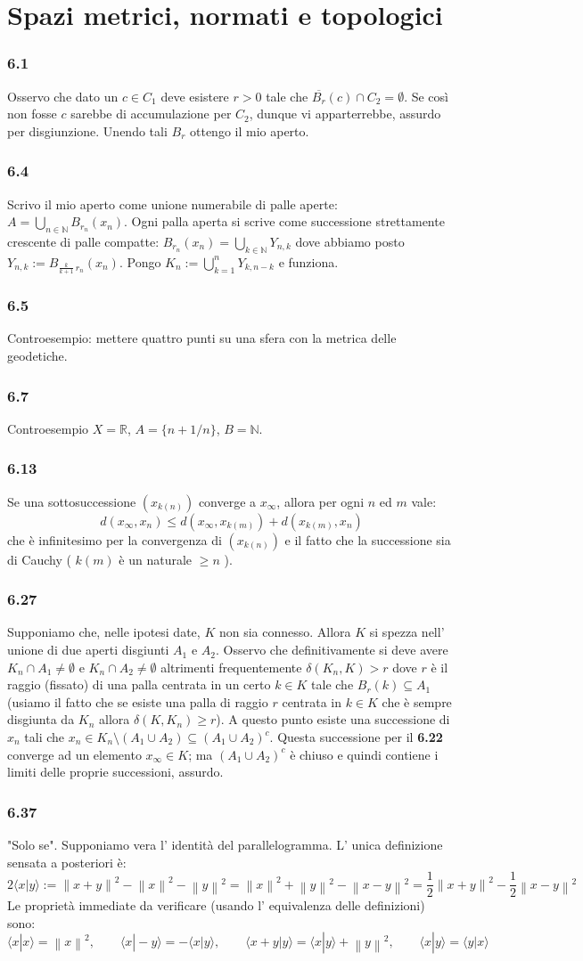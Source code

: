 \documentclass[a4paper,11pt]{article}
\newcommand{\ex}[1]{\subsubsection*{#1}}
\newcommand{\NN}{\mathbb{N}}
\newcommand{\RR}{\mathbb{R}}
\newcommand{\Norm}[1]{\left \| #1 \right\|}
\newcommand{\rec}[1]{{\bf #1}}
\begin{document}
\section{Spazi metrici, normati e topologici}
\ex{6.1} Osservo che dato un $c\in C_1$ deve esistere $r>0$ tale che $\overline{B_{r}}(c)\cap C_2=\emptyset$. Se così non fosse $c$ sarebbe di accumulazione per $C_2$, dunque vi apparterrebbe, assurdo per disgiunzione. Unendo tali $B_r$ ottengo il mio aperto.
\ex{6.4} Scrivo il mio aperto come unione numerabile di palle aperte: $A=\bigcup_{n\in\NN}B_{r_n}(x_n)$. Ogni palla aperta si scrive come successione strettamente crescente di palle compatte: $B_{r_n}(x_n)=\bigcup_{k\in\NN}Y_{n,k}$ dove abbiamo posto $Y_{n,k}:=B_{ \frac {k}{k+1}\, r_n}(x_n)$. Pongo $\displaystyle K_n:=\bigcup_{k=1}^n Y_{k,n-k}$ e funziona.
\ex{6.5} Controesempio: mettere quattro punti su una sfera con la metrica delle geodetiche.
\ex{6.7} Controesempio $X=\RR$, $A=\{n+1/n\}$, $B=\NN$.
\ex{6.13} Se una sottosuccessione \( (x_{k(n)})\) converge a \(x_{\infty}\), allora per ogni \(n\) ed $m$ vale: 
\[ d(x_{\infty},x_n) \le d\left({x_{\infty}, x_{k(m)}}\right) + d\left({x_{k(m)},x_n}\right) \]
che è infinitesimo per la convergenza di \( \left({x_{k(n)}}\right)\) e il fatto che la successione sia di Cauchy ( \(k(m)\) è un naturale \(\ge n\) ).
\ex{6.27} Supponiamo che, nelle ipotesi date, $K$ non sia connesso. Allora $K$ si spezza nell' unione di due aperti disgiunti $A_1$ e $A_2$. Osservo che definitivamente si deve avere $K_n \cap A_1 \neq \emptyset$ e $K_n \cap A_2 \neq \emptyset$ altrimenti frequentemente $\delta (K_n, K)>r$ dove $r$ è il raggio (fissato) di una palla centrata in un certo $k\in K$ tale che $B_r(k)\subseteq A_1$ (usiamo il fatto che se esiste una palla di raggio $r$ centrata in $k\in K$ che è sempre disgiunta da $K_n$ allora $\delta(K,K_n)\geq r$). A questo punto esiste una successione di $x_n$ tali che $x_n\in K_n\setminus (A_1 \cup A_2)\subseteq (A_1 \cup A_2)^c$. Questa successione per il \rec{6.22} converge ad un elemento $x_{\infty}\in K$; ma $(A_1 \cup A_2)^c$ è chiuso e quindi contiene i limiti delle proprie successioni, assurdo.
\ex{6.37} "Solo se". Supponiamo vera l' identità del parallelogramma. L' unica definizione sensata a posteriori è:
$$
2\langle x | y\rangle :=\Norm{x+y}^2-\Norm{x}^2-\Norm{y}^2=\Norm{x}^2+\Norm{y}^2-\Norm{x-y}^2=\frac{1}{2}\Norm{x+y}^2-\frac{1}{2}\Norm{x-y}^2
$$
Le proprietà immediate da verificare (usando l' equivalenza delle definizioni) sono:
$$
\langle x |x \rangle=\Norm{x}^2,\qquad  \langle x | -y \rangle = - \langle x | y \rangle, \qquad \langle x+y|y\rangle=\langle x|y\rangle +\Norm{y}^2,\qquad \langle x |y \rangle=\langle y |x \rangle
$$
\end{document}
